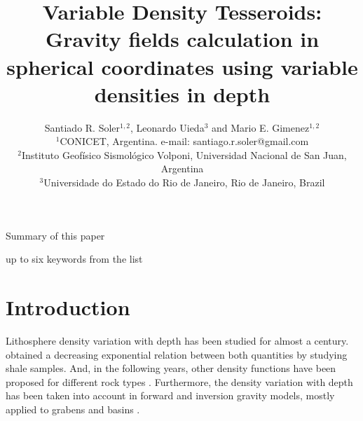 \documentclass[extra]{gji}
\begin{document}
\title[
    Variable Density Tesseroids]
    {Variable Density Tesseroids: Gravity fields calculation in spherical coordinates using variable densities in depth
}
\author[S.R. Soler, L. Uieda and M.E. Gimenez]
    {Santiado R. Soler$^{1,2}$, Leonardo Uieda$^3$ and Mario E. Gimenez$^{1,2}$ \\
    $^1$CONICET, Argentina. e-mail: santiago.r.soler@gmail.com\\
    $^2$Instituto Geofísico Sismológico Volponi, Universidad Nacional de San Juan, Argentina\\
    $^3$Universidade do Estado do Rio de Janeiro, Rio de Janeiro, Brazil
    }


\maketitle

\begin{summary}
Summary of this paper 
\end{summary}

\begin{keywords}
up to six keywords from the list
\end{keywords}



\section{Introduction}

Lithosphere density variation with depth has been studied for almost a century. 
\citet{Athy1930} obtained a decreasing exponential relation between both quantities by studying shale samples.
And, in the following years, other density functions have been proposed for different rock types \citep[e.g.][]{Maxant1980, Rao1986, Rao1993, Rao1994}.
Furthermore, the density variation with depth has been taken into account in forward and inversion gravity models, mostly applied to grabens and basins \citep{Cordell1973, Rao1986, Cowie1990, Rao1993, Rao1994, Welford2010}.
\end{document}
